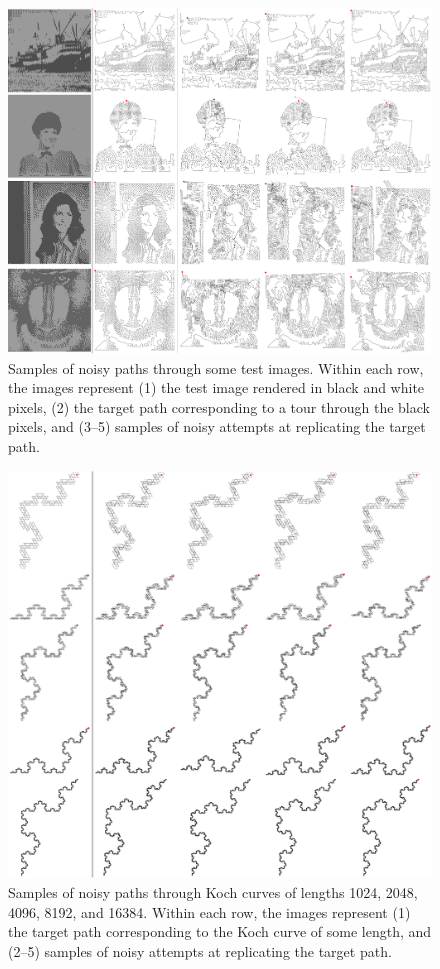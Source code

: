         \begin{figure}[hbt]
            \includegraphics[width=\columnwidth]{Files/gestalt}
            \caption{Samples of noisy paths through some test images. Within each row, the images represent (1) the test image rendered in black and white pixels, (2) the target path corresponding to a tour through the black pixels, and (3--5) samples of noisy attempts at replicating the target path.}
            \label{fig:gestalt}
        \end{figure}

        \begin{figure}[hbt]
            \includegraphics[width=0.5\textheight]{Files/koch}
            \caption{Samples of noisy paths through Koch curves of lengths 1024, 2048, 4096, 8192, and 16384. Within each row, the images represent (1) the target path corresponding to the Koch curve of some length, and (2--5) samples of noisy attempts at replicating the target path.}
            \label{fig:koch}
        \end{figure}


